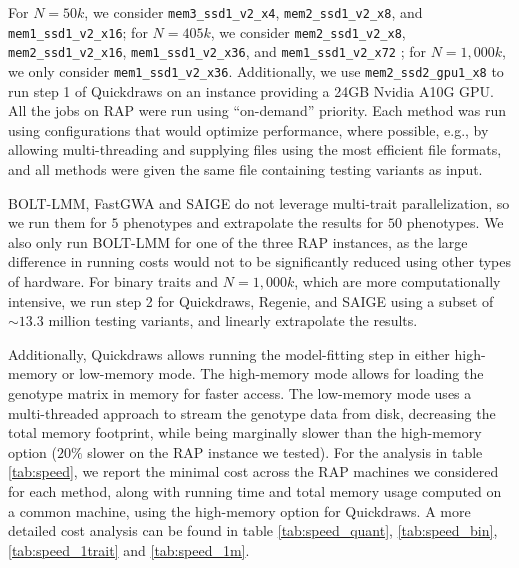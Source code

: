 \sloppy
For $N = 50k$, we consider \texttt{mem3\_ssd1\_v2\_x4}, \texttt{mem2\_ssd1\_v2\_x8}, and \texttt{mem1\_ssd1\_v2\_x16}; for $N = 405k$, we consider \texttt{mem2\_ssd1\_v2\_x8}, \texttt{mem2\_ssd1\_v2\_x16}, \texttt{mem1\_ssd1\_v2\_x36}, and \texttt{mem1\_ssd1\_v2\_x72}
\sloppy
%
; for $N = 1{,}000k$, we only consider \texttt{mem1\_ssd1\_v2\_x36}.
Additionally, we use \texttt{mem2\_ssd2\_gpu1\_x8} to run step 1 of Quickdraws on an instance providing a 24GB Nvidia A10G GPU.
%
All the jobs on RAP were run using ``on-demand'' priority.
%
Each method was run using configurations that would optimize performance, where possible, e.g., by allowing multi-threading and supplying files using the most efficient file formats, and all methods were given the same file containing testing variants as input.

BOLT-LMM, FastGWA and SAIGE do not leverage multi-trait parallelization, so we run them for $5$ phenotypes and extrapolate the results for $50$ phenotypes.
%
We also only run BOLT-LMM for one of the three RAP instances, as the large difference in running costs would not to be significantly reduced using other types of hardware.
%
For binary traits and $N = 1{,}000k$, which are more computationally intensive, we run step 2 for Quickdraws, Regenie, and SAIGE using a subset of ${\sim}13.3$ million testing variants, and linearly extrapolate the results.

%
Additionally, Quickdraws allows running the model-fitting step in either high-memory or low-memory mode.
%
The high-memory mode allows for loading the genotype matrix in memory for faster access.
%
The low-memory mode uses a multi-threaded approach to stream the genotype data from disk, decreasing the total memory footprint, while being marginally slower than the high-memory option ($20\%$ slower on the RAP instance we tested).
%
For the analysis in table \ref{tab:speed}, we report the minimal cost across the RAP machines we considered for each method, along with running time and total memory usage computed on a common machine, using the high-memory option for Quickdraws. A more detailed cost analysis can be found in table \ref{tab:speed_quant}, \ref{tab:speed_bin}, \ref{tab:speed_1trait} and \ref{tab:speed_1m}.

